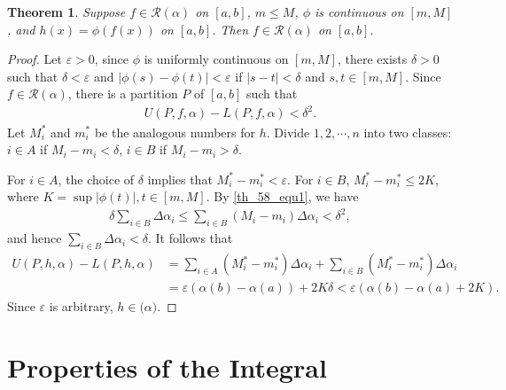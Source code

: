 \documentclass[11pt]{book}
\newtheorem{theorem}{Theorem}[chapter]
\theoremstyle{definition}
\numberwithin{equation}{chapter}
\begin{document}
\begin{theorem}\label{th_58}
Suppose $f \in \mathscr{R}(\alpha)$ on $[a,b]$, $m \leq M$, $\phi$ is continuous on $[m,M]$, and $h(x) = \phi(f(x))$ on $[a,b]$. Then $f \in \mathscr{R}(\alpha)$ on $[a,b]$.
\end{theorem}
\begin{proof}
Let $\varepsilon > 0$, since $\phi$ is uniformly continuous on $[m,M]$, there exists $\delta > 0$ such that $\delta < \varepsilon$ and $\left|\phi(s) - \phi(t)\right| < \varepsilon$ if $\left|s - t\right| < \delta$ and $s,t \in [m,M]$. Since $f \in \mathscr{R}(\alpha)$, there is a partition $P$ of $[a,b]$ such that 
\begin{align}\label{th_58_equ1}
    U(P,f,\alpha) - L(P,f,\alpha) < \delta^2.
\end{align}
Let $M^*_i$ and $m^*_i$ be the analogous numbers for $h$. Divide $1,2,\cdots,n$ into two classes: $i \in A$ if $M_i - m_i < \delta$, $i \in B$ if $M_i - m_i > \delta$.

For $i \in A$, the choice of $\delta$ implies that $M^*_i - m^*_i < \varepsilon$. For $i \in B$, $M^*_i - m^*_i \leq 2K$, where $K = \sup \left|\phi(t)\right|, t \in [m,M]$. By \eqref{th_58_equ1}, we have
\begin{align*}
    \delta \sum_{i \in B} \Delta \alpha_i \leq \sum_{i \in B} (M_i - m_i) \Delta \alpha_i < \delta^2,
\end{align*}
and hence $\sum_{i \in B} \Delta \alpha_i < \delta$. It follows that
\begin{align*}
    U(P,h,\alpha) - L(P,h,\alpha) & = \sum_{i \in A} (M^*_i - m^*_i) \Delta \alpha_i + \sum_{i \in B} (M^*_i - m^*_i) \Delta \alpha_i \\
    & = \varepsilon \left(\alpha(b) - \alpha(a)\right) + 2K\delta < \varepsilon \left(\alpha(b) - \alpha(a) + 2K\right).
\end{align*}
Since $\varepsilon$ is arbitrary, $h \in \mathscr(\alpha)$.
\end{proof}

\medskip



\section{Properties of the Integral}
\end{document}
